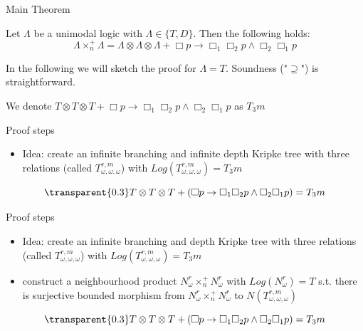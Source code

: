\begin{frame}{Main Theorem}
    \begin{theorem}
        Let $\Lambda$ be a unimodal logic with $\Lambda \in \{T,D\}$. Then the following holds:
        \[
           \Lambda \times_n^+ \Lambda = \Lambda \otimes \Lambda \otimes \Lambda + \Box p \to \Box_1\Box_2p \land \Box_2\Box_1p 
        \]
    \end{theorem}
    In the following we will sketch the proof for $\Lambda = T$. \pause 
	Soundness ("$\supseteq$") is straightforward. 

        \vspace{1.5cm}
         We denote $T \otimes T \otimes T + \Box p \to \Box_1\Box_2p \land \Box_2\Box_1p$ as $T_3m$

\end{frame}
    
\begin{frame}{Proof steps}
    \begin{itemize}
        \item Idea: create an infinite branching and infinite depth Kripke tree with three relations (called $T_{\omega,\omega,\omega}^{r,m}$) with $Log(T_{\omega,\omega,\omega}^{r,m}) = T_3m$ 
    \end{itemize}

	\vspace{2cm}
\[ 
	{\transparent{0.3} T \otimes T \otimes T + (\Box p \to \Box_1\Box_2 p \land \Box_2\Box_1 p) = T_3m }
 \]


    

	

\end{frame}

\begin{frame}{Proof steps}
	\begin{itemize}
	\setlength{\itemsep}{1em}

	\item Idea: create an infinite branching and depth Kripke tree with three relations (called $T_{\omega,\omega,\omega}^{r,m}$) with $Log(T_{\omega,\omega,\omega}^{r,m}) = T_3m$
    \item construct a neighbourhood product $N_{\omega}^r \times_n^+ N_{\omega}^r$ with $Log(N_\omega^r) = T$ s.t. there is surjective bounded morphism from $N_{\omega}^r \times_n^+ N_{\omega}^r$ to $N(T_{\omega,\omega,\omega}^{r,m})$

			\end{itemize}
\vspace{1.2cm}
\[ 
	{\transparent{0.3} T \otimes T \otimes T + (\Box p \to \Box_1\Box_2 p \land \Box_2\Box_1 p) = T_3m }
 \]
	
\end{frame}

